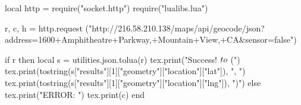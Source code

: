 \documentclass[]{article}
\begin{document}
    \begin{luacode}
    local http = require("socket.http")
    require("lualibs.lua")
    
    r, c, h = http.request ("http://216.58.210.138/maps/api/geocode/json?address=1600+Amphitheatre+Parkway,+Mountain+View,+CA&sensor=false")
    
    if r then
      local s =  utilities.json.tolua(r)
      tex.print("Success! $\\to$ (")
      tex.print(tostring(s["results"][1]["geometry"]["location"]["lat"]), ", ")
      tex.print(tostring(s["results"][1]["geometry"]["location"]["lng"]), ")")
    else
      tex.print("ERROR: ")
      tex.print(c)
    end
    \end{luacode}
\end{document}
